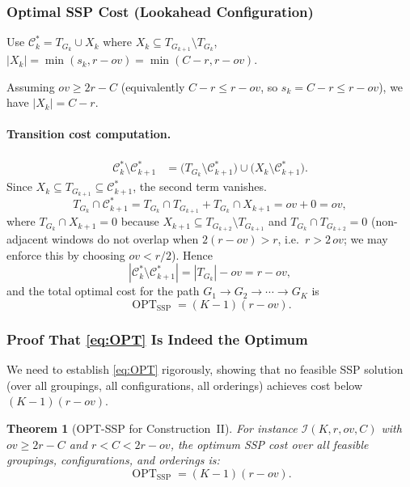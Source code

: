 \documentclass[11pt,a4paper]{article}
\theoremstyle{plain}
\newtheorem{theorem}{Theorem}[section]
\theoremstyle{definition}
\DeclareMathOperator{\OPT}{OPT}
\begin{document}
\subsubsection{Optimal SSP Cost (Lookahead Configuration)}
\label{sec:OPTcomp}

Use $\mathcal{C}_k^* = T_{G_k} \cup X_k$ where
$X_k \subseteq T_{G_{k+1}} \setminus T_{G_k}$, $|X_k| = \min(s_k, r-\mathit{ov}) = \min(C-r, r-\mathit{ov})$.

Assuming $\mathit{ov} \ge 2r - C$ (equivalently $C - r \le r - \mathit{ov}$, so
$s_k = C - r \le r - \mathit{ov}$), we have $|X_k| = C - r$.

\paragraph{Transition cost computation.}
\begin{align*}
  \mathcal{C}_k^* \setminus \mathcal{C}_{k+1}^*
  &= \bigl(T_{G_k} \setminus \mathcal{C}_{k+1}^*\bigr)
     \cup \bigl(X_k \setminus \mathcal{C}_{k+1}^*\bigr).
\end{align*}
Since $X_k \subseteq T_{G_{k+1}} \subseteq \mathcal{C}_{k+1}^*$, the second term vanishes.
\[
  T_{G_k} \cap \mathcal{C}_{k+1}^*
  = T_{G_k} \cap T_{G_{k+1}}
    + T_{G_k} \cap X_{k+1}
  = \mathit{ov} + 0
  = \mathit{ov},
\]
where $T_{G_k} \cap X_{k+1} = 0$ because $X_{k+1} \subseteq T_{G_{k+2}} \setminus T_{G_{k+1}}$
and $T_{G_k} \cap T_{G_{k+2}} = 0$ (non-adjacent windows do not overlap when
$2(r - \mathit{ov}) > r$, i.e.\ $r > 2\,\mathit{ov}$; we may enforce this by choosing
$\mathit{ov} < r/2$).
Hence
\[
  |\mathcal{C}_k^* \setminus \mathcal{C}_{k+1}^*|
  = |T_{G_k}| - \mathit{ov}
  = r - \mathit{ov},
\]
and the total optimal cost for the path $G_1 \to G_2 \to \cdots \to G_K$ is
\begin{equation}
  \boxed{\OPT_{\text{SSP}} = (K-1)(r - \mathit{ov}).}
  \label{eq:OPT}
\end{equation}

\subsubsection{Proof That \texorpdfstring{\eqref{eq:OPT}}{(2)} Is Indeed the Optimum}
\label{sec:OPTproof}

We need to establish \eqref{eq:OPT} rigorously, showing that no feasible SSP solution
(over all groupings, all configurations, all orderings) achieves cost below $(K-1)(r-\mathit{ov})$.

\begin{thmbox}
\begin{theorem}[OPT-SSP for Construction~II]
\label{thm:OPT}
For instance $\mathcal{I}(K,r,\mathit{ov},C)$ with $\mathit{ov} \ge 2r - C$ and
$r < C < 2r - \mathit{ov}$, the optimum SSP cost over all feasible groupings,
configurations, and orderings is:
\[
  \OPT_{\text{SSP}} = (K-1)(r - \mathit{ov}).
\]
\end{theorem}
\end{thmbox}
\end{document}

